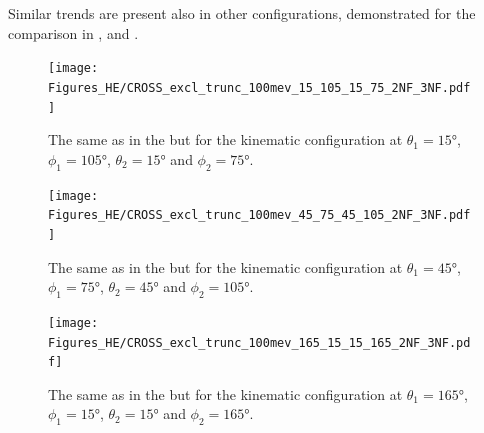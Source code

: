     Similar trends are present also in other configurations, demonstrated for the comparison in
    ,
     and
    .

    
        \begin{figure}[h]
            \begin{center}
                \texttt{[image: Figures\_HE/CROSS\_excl\_trunc\_100mev\_15\_105\_15\_75\_2NF\_3NF.pdf]}
                \end{center}
                \caption{The same as in the  but for the kinematic
                configuration at
                $\theta_1 = \ang{15}$, $\phi_1 = \ang{105}$,
                $\theta_2 = \ang{15}$ and $\phi_2 = \ang{75}$.}
                \label{CROSS_HE_EXCL_15_105_15_75}
        \end{figure}




        \begin{figure}[h]
            \begin{center}
                \texttt{[image: Figures\_HE/CROSS\_excl\_trunc\_100mev\_45\_75\_45\_105\_2NF\_3NF.pdf]}
                \end{center}
                \caption{The same as in the  but for the kinematic
                configuration at
                $\theta_1 = \ang{45}$, $\phi_1 = \ang{75}$,
                $\theta_2 = \ang{45}$ and $\phi_2 = \ang{105}$.}
                \label{CROSS_HE_EXCL_45_75_45_105}
        \end{figure}


        \begin{figure}[h]
            \begin{center}
                \texttt{[image: Figures\_HE/CROSS\_excl\_trunc\_100mev\_165\_15\_15\_165\_2NF\_3NF.pdf]}
                \end{center}
                \caption{The same as in the  but for the kinematic
                configuration at
                $\theta_1 = \ang{165}$, $\phi_1 = \ang{15}$,
                $\theta_2 = \ang{15}$ and $\phi_2 = \ang{165}$.}
                \label{CROSS_HE_EXCL_165_15_15_165}
        \end{figure}


